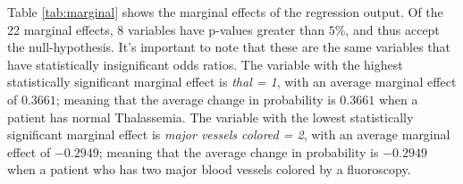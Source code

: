 Table \ref{tab:marginal} shows the marginal effects of the regression output. Of the 22 marginal effects, 8 variables have p-values greater than $5\%$, and thus accept the null-hypothesis. 
It's important to note that these are the same variables that have statistically insignificant odds ratios.
The variable with the highest statistically significant marginal effect is \emph{thal = 1}, with an average marginal effect of $0.3661$; meaning that the average change in probability is $0.3661$ when a patient has normal Thalassemia. 
The variable with the lowest statistically significant marginal effect is \emph{major vessels colored = 2}, with an average marginal effect of $-0.2949$; meaning that the average change in probability is $-0.2949$ when a patient who has two major blood vessels colored by a fluoroscopy.



